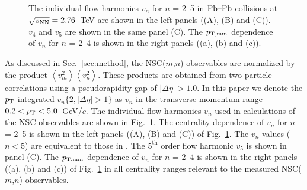 \begin{figure}[t!]
	\begin{center}
        \caption{The individual flow harmonics $v_n$ for $n$ = 2--5 in $\textnormal{Pb--Pb}$ collisions at $\sqrt{s_{\textnormal{NN}}}=2.76$~TeV are shown in the left panels ((A), (B) and (C)). $v_4$ and $v_5$ are shown in the same panel (C). The $p_{\rm T, min}$ dependence of $v_n$ for $n$ = 2--4 is shown in the right panels ((a), (b) and (c)).}
        \label{fig:Figure_3}
        \end{center}   
\end{figure}

As discussed in Sec.~\ref{sec:method}, the NSC($m$,$n$) observables are normalized by the product $\left<v_{m}^2\right>\left<v_{n}^2\right>$.
These products are obtained from two-particle correlations using a pseudorapidity gap of $|\Delta\eta| > 1.0$. 
In this paper we denote the $p_{\rm T}$ integrated $v_{n}\{2, |\Delta\eta|>1\}$ as $v_n$ in the transverse momentum range $0.2<p_{\rm T}<5.0$~GeV/$c$.
The individual flow harmonics $v_n$ used in calculations of the NSC observables are shown in Fig.~\ref{fig:Figure_3}.
The centrality dependence of $v_n$ for $n$ = 2--5 is shown in the left panels ((A), (B) and (C)) of  Fig.~\ref{fig:Figure_3}. The $v_n$ values ($n < 5$) are equivalent to those in \cite{Adam:2016izf}. The $5^{\mathrm{th}}$ order flow harmonic $v_5$ is shown in panel (C). The $p_{\rm T, min}$ dependence of $v_n$ for $n$ = 2--4 is shown in the right panels ((a), (b) and (c)) of Fig.~\ref{fig:Figure_3} in all centrality ranges relevant to the measured NSC($m$,$n$) observables.

